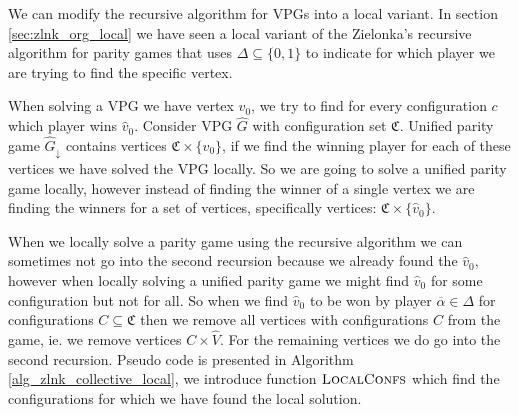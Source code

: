 We can modify the recursive algorithm for VPGs into a local variant. In section \ref{sec:zlnk_org_local} we have seen a local variant of the Zielonka's recursive algorithm for parity games that uses $\Delta \subseteq \{0,1\}$ to indicate for which player we are trying to find the specific vertex.

When solving a VPG we have vertex $\hat{v}_0$, we try to find for every configuration $c$ which player wins $\hat{v}_0$. Consider VPG $\hat{G}$ with configuration set $\mathfrak{C}$. Unified parity game $\hat{G}_{\downarrow}$ contains vertices $\mathfrak{C} \times \{\hat{v}_0\}$, if we find the winning player for each of these vertices we have solved the VPG locally. So we are going to solve a unified parity game locally, however instead of finding the winner of a single vertex we are finding the winners for a set of vertices, specifically vertices: $\mathfrak{C} \times \{\hat{v}_0\}$.

When we locally solve a parity game using the recursive algorithm we can sometimes not go into the second recursion because we already found the $\hat{v}_0$, however when locally solving a unified parity game we might find $\hat{v}_0$ for some configuration but not for all. So when we find $\hat{v}_0$ to be won by player $\overline{\alpha} \in \Delta$ for configurations $C \subseteq \mathfrak{C}$ then we remove all vertices with configurations $C$ from the game, ie. we remove vertices $C \times \hat{V}$. For the remaining vertices we do go into the second recursion. Pseudo code is presented in Algorithm \ref{alg_zlnk_collective_local}, we introduce function $\textsc{LocalConfs}$ which find the configurations for which we have found the local solution.

